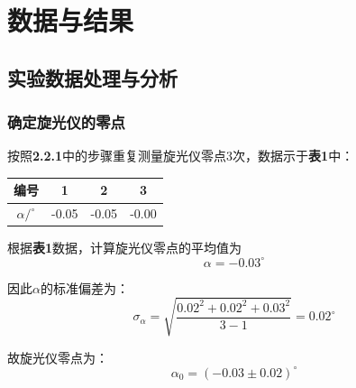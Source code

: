 \documentclass[12pt]{article}
\begin{document}
	\vbox{}
	 \section{数据与结果}
 		\subsection{实验数据处理与分析}
 			\subsubsection{确定旋光仪的零点}
			 按照\textbf{2.2.1}中的步骤重复测量旋光仪零点3次，数据示于\textbf{表1}中：
			 \begin{table}[h]
				\centering
				\begin{tabular}{cccc}
					\toprule
					编号 & 1 & 2 & 3\\
					\midrule
					$\alpha / ^{\circ}$ & -0.05 & -0.05 & -0.00\\
					\bottomrule
				\end{tabular}
			\end{table}
			\par
			根据\textbf{表1}数据，计算旋光仪零点的平均值为
			$$\alpha=-0.03^{\circ}
			$$\par
			因此$\alpha$的标准偏差为：
			$$
			\sigma_{\alpha}=\sqrt{\frac{0.02^{2}+0.02^{2}+0.03^{2}}{3-1}}=0.02^{\circ}
			$$\par
			故旋光仪零点为：
			$$
			\alpha_{0}=(-0.03\pm 0.02)^{\circ}
			$$\par
\end{document}
